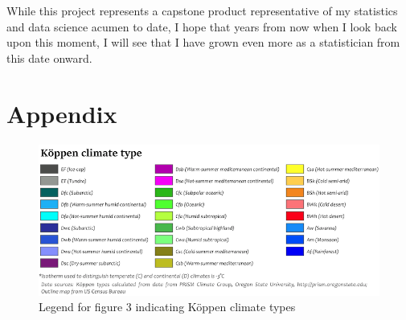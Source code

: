 \documentclass[12pt]{article}
\begin{document}
While this project represents a capstone product representative of my
statistics and data science acumen to date, I hope that years from now
when I look back upon this moment, I will see that I have grown even
more as a statistician from this date onward.

\newpage

\hypertarget{appendix}{%
\section{Appendix}\label{appendix}}

\begin{figure}

{\centering \includegraphics[width=0.9\linewidth]{images/koppen-climate-type-legend} 

}

\caption{Legend for figure 3 indicating Köppen climate types}\label{fig:unnamed-chunk-6}
\end{figure}



\end{document}
